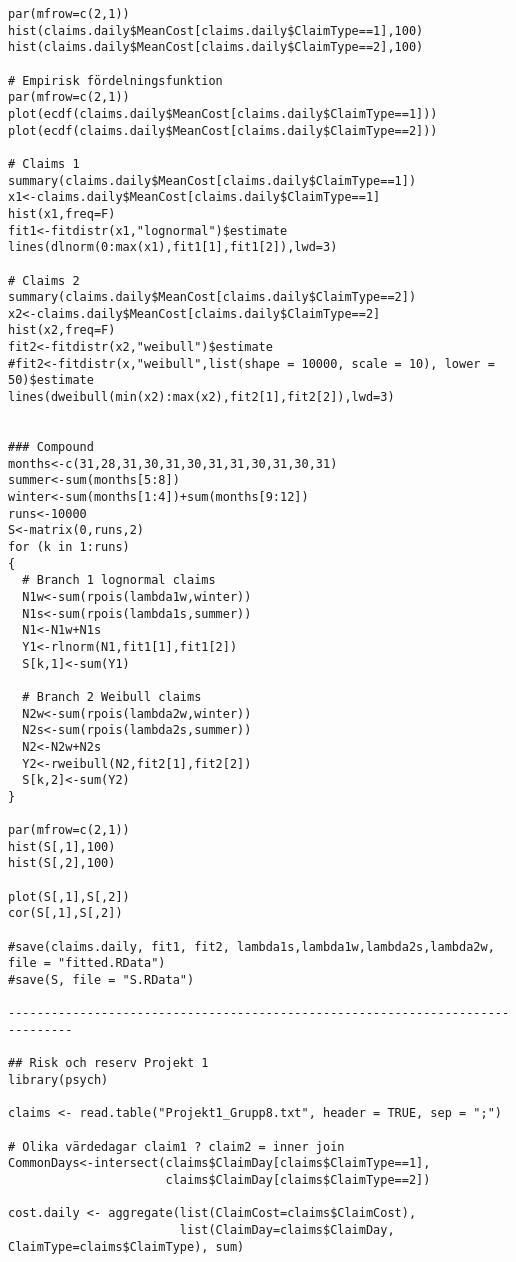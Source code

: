 \documentclass[11pt]{article}
\begin{document}
\begin{verbatim}
par(mfrow=c(2,1))
hist(claims.daily$MeanCost[claims.daily$ClaimType==1],100)
hist(claims.daily$MeanCost[claims.daily$ClaimType==2],100)

# Empirisk fördelningsfunktion
par(mfrow=c(2,1))
plot(ecdf(claims.daily$MeanCost[claims.daily$ClaimType==1]))
plot(ecdf(claims.daily$MeanCost[claims.daily$ClaimType==2]))

# Claims 1
summary(claims.daily$MeanCost[claims.daily$ClaimType==1])
x1<-claims.daily$MeanCost[claims.daily$ClaimType==1]
hist(x1,freq=F)
fit1<-fitdistr(x1,"lognormal")$estimate
lines(dlnorm(0:max(x1),fit1[1],fit1[2]),lwd=3)

# Claims 2
summary(claims.daily$MeanCost[claims.daily$ClaimType==2])
x2<-claims.daily$MeanCost[claims.daily$ClaimType==2]
hist(x2,freq=F)
fit2<-fitdistr(x2,"weibull")$estimate
#fit2<-fitdistr(x,"weibull",list(shape = 10000, scale = 10), lower = 50)$estimate
lines(dweibull(min(x2):max(x2),fit2[1],fit2[2]),lwd=3)


### Compound
months<-c(31,28,31,30,31,30,31,31,30,31,30,31)
summer<-sum(months[5:8])
winter<-sum(months[1:4])+sum(months[9:12])
runs<-10000
S<-matrix(0,runs,2)
for (k in 1:runs)
{
  # Branch 1 lognormal claims
  N1w<-sum(rpois(lambda1w,winter))
  N1s<-sum(rpois(lambda1s,summer))
  N1<-N1w+N1s
  Y1<-rlnorm(N1,fit1[1],fit1[2])
  S[k,1]<-sum(Y1)
  
  # Branch 2 Weibull claims
  N2w<-sum(rpois(lambda2w,winter))
  N2s<-sum(rpois(lambda2s,summer))
  N2<-N2w+N2s
  Y2<-rweibull(N2,fit2[1],fit2[2])
  S[k,2]<-sum(Y2)
}

par(mfrow=c(2,1))
hist(S[,1],100)
hist(S[,2],100)

plot(S[,1],S[,2])
cor(S[,1],S[,2])

#save(claims.daily, fit1, fit2, lambda1s,lambda1w,lambda2s,lambda2w, file = "fitted.RData")
#save(S, file = "S.RData")

-------------------------------------------------------------------------------

## Risk och reserv Projekt 1
library(psych)

claims <- read.table("Projekt1_Grupp8.txt", header = TRUE, sep = ";")

# Olika värdedagar claim1 ? claim2 = inner join
CommonDays<-intersect(claims$ClaimDay[claims$ClaimType==1],
                      claims$ClaimDay[claims$ClaimType==2])

cost.daily <- aggregate(list(ClaimCost=claims$ClaimCost),
                        list(ClaimDay=claims$ClaimDay, ClaimType=claims$ClaimType), sum)


\end{verbatim}
\end{document}
